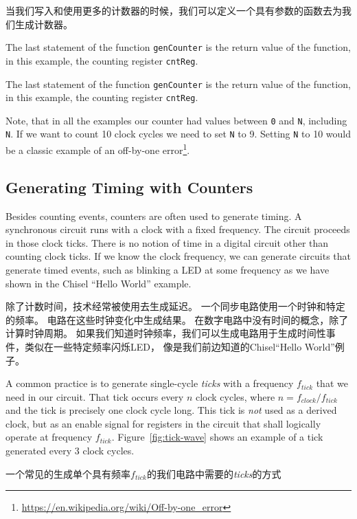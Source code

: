 \documentclass[%
    10pt,
    headinclude, footexclude,
    openright, %
    notitlepage,
    cleardoubleempty,
    headsepline,
    pointlessnumbers,
    bibtotoc, idxtotoc,
    ]{scrbook}
\newcommand{\code}[1]{{\small{\texttt{#1}}}}
\newcommand{\myref}[2]{\href{#1}{#2}}
\renewcommand{\myref}[2]{{#2}{\footnote{\url{#1}}}}
\begin{document}
\noindent 当我们写入和使用更多的计数器的时候，我们可以定义一个具有参数的函数去为我们生成计数器。


\noindent The last statement of the function \code{genCounter} is the return
value of the function, in this example, the counting register \code{cntReg}.

\noindent The last statement of the function \code{genCounter} is the return
value of the function, in this example, the counting register \code{cntReg}.

Note, that in all the examples our counter had values between \code{0} and
\code{N}, including \code{N}. If we want to count 10 clock cycles we need
to set \code{N} to 9. Setting \code{N} to 10 would be a classic example of an
\myref{https://en.wikipedia.org/wiki/Off-by-one_error}{off-by-one error}.

\subsection{Generating Timing with Counters}

Besides counting events, counters are often used to generate timing.
A synchronous circuit runs with a clock with a fixed frequency.
The circuit proceeds in those clock ticks. There is no notion of time in a digital
circuit other than counting clock ticks. If we know the clock frequency, we
can generate circuits that generate timed events, such as blinking a LED
at some frequency as we have shown in the Chisel ``Hello World'' example.

除了计数时间，技术经常被使用去生成延迟。
一个同步电路使用一个时钟和特定的频率。
电路在这些时钟变化中生成结果。
在数字电路中没有时间的概念，除了计算时钟周期。
如果我们知道时钟频率，我们可以生成电路用于生成时间性事件，类似在一些特定频率闪烁LED，
像是我们前边知道的Chisel``Hello World''例子。

A common practice is to generate single-cycle \emph{ticks} with a frequency $f_{tick}$
that we need in our circuit. That tick occurs every $n$ clock cycles,
where $n = f_{clock}/f_{tick}$ and the tick is precisely one clock cycle long.
This tick is \emph{not} used as a derived clock, but as an enable signal for
registers in the circuit that shall logically operate at frequency $f_{tick}$.
Figure~\ref{fig:tick-wave} shows an example of a tick generated every
3 clock cycles.

一个常见的生成单个具有频率$f_{tick}$的我们电路中需要的\emph{ticks}的方式
\end{document}
